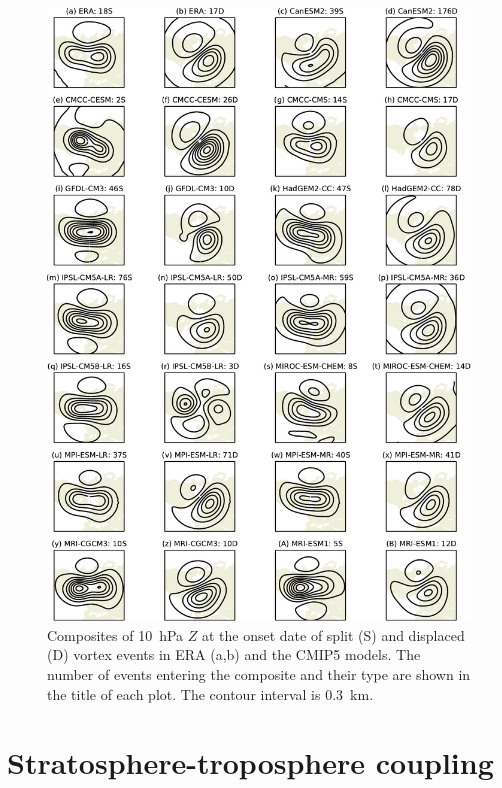 \begin{figure}
 \centering
 \noindent\includegraphics[width=\textwidth]{figures/chapter-models/10hPa_GPH_composites.pdf}
 \caption[Composites of 10~hPa $Z$ at the onset date split and displaced vortex
 events in the CMIP5 models.]{Composites of 10~hPa $Z$ at the onset date of
   split (S) and displaced (D) vortex events in ERA (a,b) and the CMIP5
   models. The number of events entering the composite and their type are
   shown in the title of each plot. The contour interval is 0.3~km.}
 \label{fig:10hPa_GPH_comp}
\end{figure}




\section{Stratosphere-troposphere coupling}
